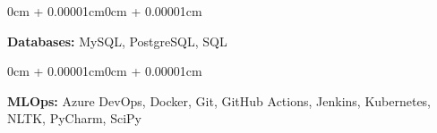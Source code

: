 \documentclass[10pt, letterpaper]{article}
\newenvironment{onecolentry}{
    \begin{adjustwidth}{0cm + 0.00001cm}{0cm + 0.00001cm}
}{
    \end{adjustwidth}
}
\begin{document}
\vspace{0.1cm}

\begin{onecolentry}
    \textbf{Databases:} MySQL, PostgreSQL, SQL
\end{onecolentry}

\vspace{0.1cm}

\begin{onecolentry}
    \textbf{MLOps:} Azure DevOps, Docker, Git, GitHub Actions, Jenkins, Kubernetes, NLTK, PyCharm, SciPy
\end{onecolentry}

\end{document}
